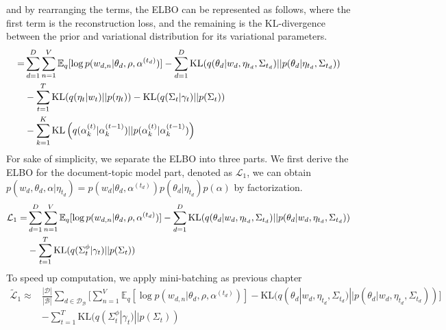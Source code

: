 and by rearranging the terms, the ELBO can be represented as follows, where the first term is the reconstruction loss, and the remaining is the KL-divergence between the prior and variational distribution for its variational parameters.
\begin{align}\label{eq:ch5_elbo1}
=&\sum_{d=1}^{D}\sum_{n=1}^{V}\mathbb{E}_q[\log p(w_{d,n}|\theta_d,\rho,\alpha^{(t_d)})]-\sum_{d=1}^{D}\text{KL}(q(\theta_d|w_d,\eta_{t_d},\Sigma_{t_d})||p(\theta_d|\eta_{t_d},\Sigma_{t_d}))\notag\\
&-\sum_{t=1}^{T}\text{KL}(q(\eta_{t}|w_{t})||p(\eta_{t}))-\text{KL}(q(\Sigma_{t}|\gamma_{t})||p(\Sigma_{t}))\notag\\
&-\sum_{k=1}^{K}\text{KL}\left(q(\alpha_{k}^{(t)}|\alpha_{k}^{(t-1)})||p(\alpha_{k}^{(t)}|\alpha_{k}^{(t-1)})\right)
\end{align}
For sake of simplicity, we separate the ELBO into three parts. We first derive the ELBO for the document-topic model part, denoted as $ \mathcal{L}_{1} $, we can obtain $ p(w_d,\theta_d,\alpha|\eta_{t_d})=p(w_d|\theta_d,\alpha^{(t_d)})p(\theta_{d}|\eta_{t_d})p(\alpha)$ by factorization. 
\begin{align}\label{eq:ch5_elbo_p1}
\mathcal{L}_{1}=&\sum_{d=1}^{D}\sum_{n=1}^{V}\mathbb{E}_q[\log p(w_{d,n}|\theta_d,\rho,\alpha^{(t_d)})]-\sum_{d=1}^{D}\text{KL}(q(\theta_d|w_d,\eta_{t_d},\Sigma_{t_d})||p(\theta_d|w_d,\eta_{t_d},\Sigma_{t_d}))\notag\\
&-\sum_{t=1}^{T}\text{KL}(q(\Sigma^\phi_{t}|\gamma_{t})||p(\Sigma_{t}))
\end{align}
To speed up computation, we apply mini-batching as previous chapter
\begin{align}
\tilde{\mathcal{L}}_{1}\approx&\frac{|\mathcal{D}|}{|\mathcal{B}|}\sum_{d\in\mathcal{D}_{\mathcal{B}}}\bigg[\sum_{n=1}^{V}\mathbb{E}_q[\log p(w_{d,n}|\theta_d,\rho,\alpha^{(t_d)})]-\text{KL}(q(\theta_d|w_d,\eta_{t_d},\Sigma_{t_d})||p(\theta_d|w_d,\eta_{t_d},\Sigma_{t_d}))\bigg]\\
&-\sum_{t=1}^{T}\text{KL}(q(\Sigma^\phi_{t}|\gamma_{t})||p(\Sigma_{t}))
\end{align}
